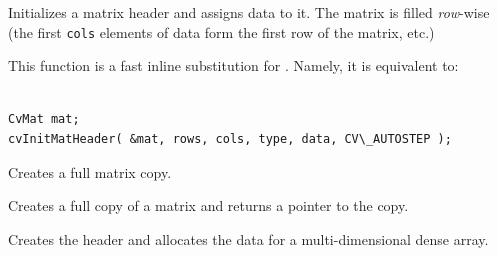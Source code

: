 \begin{description}
\end{description}

Initializes a matrix header and assigns data to it. The matrix is filled \textit{row}-wise (the first \texttt{cols} elements of data form the first row of the matrix, etc.)

This function is a fast inline substitution for . Namely, it is equivalent to:

\begin{lstlisting}

CvMat mat;
cvInitMatHeader( &mat, rows, cols, type, data, CV\_AUTOSTEP );

\end{lstlisting}


\label{CloneMat}

Creates a full matrix copy.


\begin{description}
\end{description}

Creates a full copy of a matrix and returns a pointer to the copy.

\label{CreateMatND}

Creates the header and allocates the data for a multi-dimensional dense array.


\begin{description}
\end{description}

